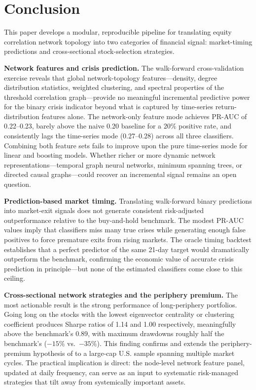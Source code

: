 \documentclass{article}
\begin{document}
\section{Conclusion}
\label{sec:conclusion}

This paper develops a modular, reproducible pipeline for translating equity correlation network topology into two categories of financial signal: market-timing predictions and cross-sectional stock-selection strategies.

\textbf{Network features and crisis prediction.} The walk-forward cross-validation exercise reveals that global network-topology features---density, degree distribution statistics, weighted clustering, and spectral properties of the threshold correlation graph---provide no meaningful incremental predictive power for the binary crisis indicator beyond what is captured by time-series return-distribution features alone. The network-only feature mode achieves PR-AUC of 0.22--0.23, barely above the naive 0.20 baseline for a 20\% positive rate, and consistently lags the time-series mode (0.27--0.28) across all three classifiers. Combining both feature sets fails to improve upon the pure time-series mode for linear and boosting models. Whether richer or more dynamic network representations---temporal graph neural networks, minimum spanning trees, or directed causal graphs---could recover an incremental signal remains an open question.

\textbf{Prediction-based market timing.} Translating walk-forward binary predictions into market-exit signals does not generate consistent risk-adjusted outperformance relative to the buy-and-hold benchmark. The modest PR-AUC values imply that classifiers miss many true crises while generating enough false positives to force premature exits from rising markets. The oracle timing backtest establishes that a perfect predictor of the same 21-day target would dramatically outperform the benchmark, confirming the economic value of accurate crisis prediction in principle---but none of the estimated classifiers come close to this ceiling.

\textbf{Cross-sectional network strategies and the periphery premium.} The most actionable result is the strong performance of long-periphery portfolios. Going long on the stocks with the lowest eigenvector centrality or clustering coefficient produces Sharpe ratios of 1.14 and 1.00 respectively, meaningfully above the benchmark's 0.89, with maximum drawdowns roughly half the benchmark's ($-15\%$ vs.\ $-35\%$). This finding confirms and extends the periphery-premium hypothesis of \cite{pozzi2013} to a large-cap U.S. sample spanning multiple market cycles. The practical implication is direct: the node-level network feature panel, updated at daily frequency, can serve as an input to systematic risk-managed strategies that tilt away from systemically important assets.
\end{document}
